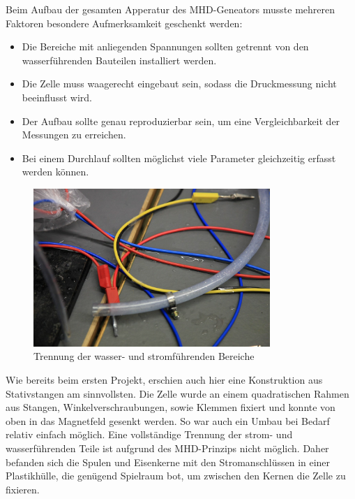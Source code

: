 \documentclass[11pt]{scrartcl}
\begin{document}
Beim Aufbau der gesamten Apperatur des MHD-Geneators musste mehreren Faktoren besondere Aufmerksamkeit geschenkt werden: 
\begin{itemize}
	\item Die Bereiche mit anliegenden Spannungen sollten getrennt von den wasserf\"uhrenden Bauteilen installiert werden. 
	\item Die Zelle muss waagerecht eingebaut sein, sodass die Druckmessung nicht beeinflusst wird.
	\item Der Aufbau sollte genau reproduzierbar sein, um eine Vergleichbarkeit der Messungen zu erreichen.
	\item Bei einem Durchlauf sollten m\"oglichst viele Parameter gleichzeitig erfasst werden k\"onnen.
\end{itemize} 

\begin{figure}[ht]
\begin{center}
\includegraphics[width=0.8\textwidth]{images/wasser-strom1.jpg}
\end{center}
\vspace{-1.5\baselineskip}
\caption{Trennung der wasser- und stromf\"uhrenden Bereiche}
\label{wasser-strom1}
\end{figure}

Wie bereits beim ersten Projekt, erschien auch hier eine Konstruktion aus Stativstangen am sinnvollsten. Die Zelle wurde an einem quadratischen Rahmen aus Stangen, Winkelverschraubungen, sowie Klemmen fixiert und konnte von oben in das Magnetfeld gesenkt werden. So war auch ein Umbau bei Bedarf relativ einfach m\"oglich. Eine vollst\"andige Trennung der strom- und wasserf\"uhrenden Teile ist aufgrund des MHD-Prinzips nicht m\"oglich. Daher befanden sich die Spulen und Eisenkerne mit den Stromanschl\"ussen in einer Plastikh\"ulle, die gen\"ugend Spielraum bot, um zwischen den Kernen die Zelle zu fixieren. 
\end{document}
